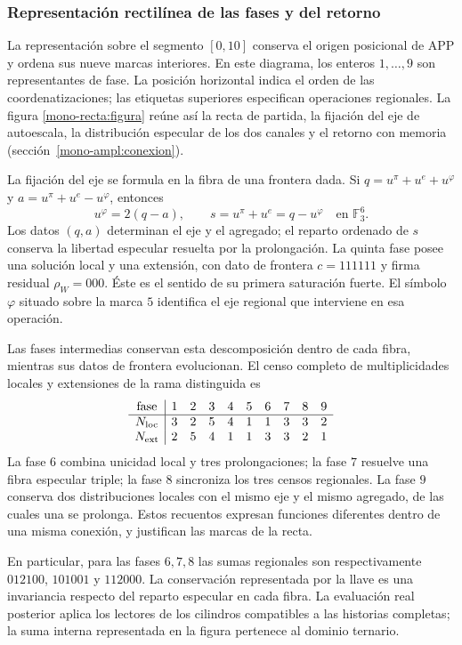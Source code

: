\subsubsection{Representación rectilínea de las fases y del retorno}
\label{mono-recta:desarrollo}

La representación sobre el segmento \([0,10]\) conserva el origen
posicional de APP y ordena sus nueve marcas interiores. En este diagrama,
los enteros \(1,\ldots,9\) son representantes de fase. La posición
horizontal indica el orden de las coordenatizaciones; las etiquetas superiores
especifican operaciones regionales. La figura
\ref{mono-recta:figura} reúne así la recta de partida, la fijación del
eje de autoescala, la distribución especular de los dos canales y el
retorno con memoria (sección~\ref{mono-ampl:conexion}).



La fijación del eje se formula en la fibra de una frontera dada. Si
\(q=u^\pi+u^e+u^\varphi\) y
\(a=u^\pi+u^e-u^\varphi\), entonces
\[
 u^\varphi=2(q-a),\qquad s=u^\pi+u^e=q-u^\varphi
 \quad\text{en }\mathbb F_3^6.
\]
Los datos \((q,a)\) determinan el eje y el agregado; el reparto ordenado
de \(s\) conserva la libertad especular resuelta por la prolongación.
La quinta fase posee una solución local y una extensión, con dato
de frontera \(c=111111\) y firma residual \(\rho_W=000\). Éste es el
sentido de su primera saturación fuerte. El símbolo \(\varphi\)
situado sobre la marca \(5\) identifica el eje regional que interviene
en esa operación.

Las fases intermedias conservan esta descomposición dentro de cada fibra,
mientras sus datos de frontera evolucionan. El censo completo de
multiplicidades locales y extensiones de la rama distinguida es
\[
\begin{array}{c|rrrrrrrrr}
\text{fase}&1&2&3&4&5&6&7&8&9\\\hline
N_{\rm loc}&3&2&5&4&1&1&3&3&2\\
N_{\rm ext}&2&5&4&1&1&3&3&2&1
\end{array}
\]
La fase \(6\) combina unicidad local y tres prolongaciones; la fase
\(7\) resuelve una fibra especular triple; la fase \(8\) sincroniza
los tres censos regionales. La fase \(9\) conserva dos distribuciones
locales con el mismo eje y el mismo agregado, de las cuales una se
prolonga. Estos recuentos expresan funciones diferentes dentro de una
misma conexión, y justifican las marcas de la recta.

En particular, para las fases \(6,7,8\) las sumas regionales son
respectivamente \(012100\), \(101001\) y \(112000\). La conservación
representada por la llave es una invariancia respecto del reparto
especular en cada fibra. La evaluación real posterior aplica los
lectores de los cilindros compatibles a las historias completas; la
suma interna representada en la figura pertenece al dominio ternario.

